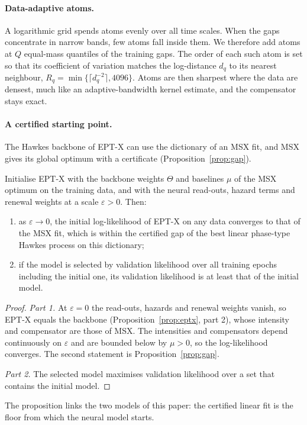 \paragraph{Data-adaptive atoms.} A logarithmic grid spends atoms evenly over all time scales. When
the gaps concentrate in narrow bands, few atoms fall inside them. We therefore add atoms at $Q$
equal-mass quantiles of the training gaps. The order of each such atom is set so that its
coefficient of variation matches the log-distance $d_q$ to its nearest neighbour,
$R_q=\min\{\lceil d_q^{-2}\rceil,4096\}$. Atoms are then sharpest where the data are densest, much
like an adaptive-bandwidth kernel estimate, and the compensator stays exact.

\paragraph{A certified starting point.} The Hawkes backbone of EPT-X can use the dictionary of an
MSX fit, and MSX gives its global optimum with a certificate (Proposition~\ref{prop:gap}).

\begin{proposition}\label{prop:floor}
Initialise EPT-X with the backbone weights $\Theta$ and baselines $\mu$ of the MSX optimum on the
training data, and with the neural read-outs, hazard terms and renewal weights at a scale
$\varepsilon>0$. Then:
\begin{enumerate}
\item as $\varepsilon\to0$, the initial log-likelihood of EPT-X on any data converges to that of the
MSX fit, which is within the certified gap of the best linear phase-type Hawkes process on this
dictionary;
\item if the model is selected by validation likelihood over all training epochs including the
initial one, its validation likelihood is at least that of the initial model.
\end{enumerate}
\end{proposition}

\begin{proof}
\emph{Part 1.} At $\varepsilon=0$ the read-outs, hazards and renewal weights vanish, so EPT-X equals
the backbone (Proposition~\ref{prop:eptx}, part 2), whose intensity and compensator are those of
MSX. The intensities and compensators depend continuously on $\varepsilon$ and are bounded below by
$\mu>0$, so the log-likelihood converges. The second statement is Proposition~\ref{prop:gap}.

\emph{Part 2.} The selected model maximises validation likelihood over a set that contains the
initial model.
\end{proof}

The proposition links the two models of this paper: the certified linear fit is the floor from
which the neural model starts.

